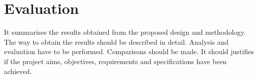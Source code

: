 \section{Evaluation}
	It summarises the results obtained from the proposed design and methodology. The way to obtain the results should be described in detail. Analysis and evaluation have to be performed. Comparisons should be made. It should justifies if the project aims, objectives, requirements and specifications have been achieved.